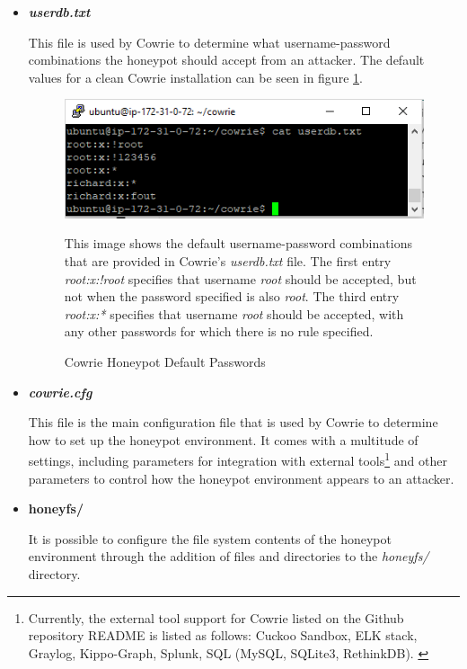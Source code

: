    \begin{itemize}
    \item \textit{\textbf{userdb.txt}}

    This file is used by Cowrie to determine what username-password combinations the honeypot should accept from an attacker. The default values for a clean Cowrie installation can be seen in figure \ref{fig:userdb_default}.
    
    \begin{figure}[ht]
      \centering
      \includegraphics[width=160mm, scale=0.6]{Images/userdb_default_screenshot.PNG}
      \caption{Cowrie Honeypot Default Passwords} 
      \medskip
	  \small
		This image shows the default username-password combinations that are provided in Cowrie's \textit{userdb.txt} file. The first entry \textit{root:x:!root} specifies that username \textit{root} should be accepted, but not when the password specified is also \textit{root}. The third entry \textit{root:x:*} specifies that username \textit{root} should be accepted, with any other passwords for which there is no rule specified.
\label{fig:userdb_default}
\end{figure}
    
    \item \textit{\textbf{cowrie.cfg}}

    This file is the main configuration file that is used by Cowrie to determine how to set up the honeypot environment. It comes with a multitude of settings, including parameters for integration with external tools\footnote{Currently, the external tool support for Cowrie listed on the Github repository README is listed as follows: Cuckoo Sandbox, ELK stack, Graylog, Kippo-Graph, Splunk, SQL (MySQL, SQLite3, RethinkDB). \cite{CowrieGithub}} and other parameters to control how the honeypot environment appears to an attacker. 
\item \textbf{honeyfs/}

It is possible to configure the file system contents of the honeypot environment through the addition of files and directories to the \textit{honeyfs/} directory. 
    \end{itemize}
    
